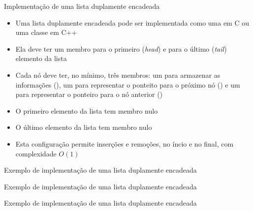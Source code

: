 \begin{frame}[fragile]{Implementação de uma lista duplamente encadeada}

    \begin{itemize}
        \item Uma lista duplamente encadeada pode ser implementada como uma  em C 
            ou uma classe em C++

        \item Ela deve ter um membro para o primeiro (\textit{head}) e para o último
            (\textit{tail}) elemento da lista

        \item Cada nó deve ter, no mínimo, três membros: um para armazenar as informações 
            (), um para representar o ponteito para o próximo nó
            () e um para representar o ponteiro para o nó anterior
            ()

        \item O primeiro elemento da lista tem membro  nulo
        \item O último elemento da lista tem membro  nulo

        \item Esta configuração permite inserções e remoções, no íncio e no final, com
            complexidade $O(1)$
    \end{itemize}

\end{frame}

\begin{frame}[fragile]{Exemplo de implementação de uma lista duplamente encadeada}
\end{frame}

\begin{frame}[fragile]{Exemplo de implementação de uma lista duplamente encadeada}
\end{frame}

\begin{frame}[fragile]{Exemplo de implementação de uma lista duplamente encadeada}
\end{frame}

